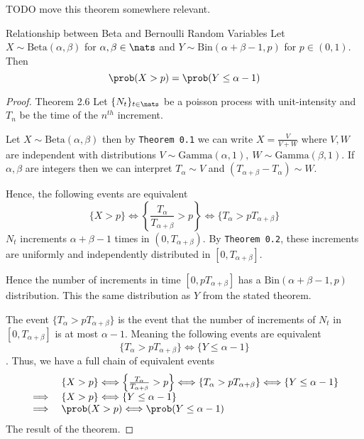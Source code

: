 \documentclass[11pt,a4paper]{article}
\begin{document}
  TODO move this theorem somewhere relevant.\\
  \begin{theorem}{Relationship between Beta and Bernoulli Random Variables}
    Let $X\sim\text{Beta}(\alpha,\beta)$ for $\alpha,\beta\in\nats$ and $Y\sim\text{Bin}(\alpha+\beta-1,p)$ for $p\in(0,1)$. Then
    \[ \prob(X>p)=\prob(Y\leq\alpha-1) \]
  \end{theorem}

  \begin{proof}{Theorem 2.6}
    Let $\{N_t\}_{t\in\nats}$ be a poisson process with unit-intensity and $T_n$ be the time of the $n^{th}$ increment.
    \par Let $X\sim\text{Beta}(\alpha,\beta)$ then by \texttt{Theorem 0.1} we can write $X=\frac{V}{V+W}$ where $V,W$ are independent with distributions $V\sim\text{Gamma}(\alpha,1),\ W\sim\text{Gamma}(\beta,1)$. If $\alpha,\beta$ are integers then we can interpret $T_\alpha\sim V$ and $(T_{\alpha+\beta}-T_\alpha)\sim W$.
    \par Hence, the following events are equivalent
    \[ \{X>p\}\Longleftrightarrow\left\{\frac{T_\alpha}{T_{\alpha+\beta}}>p\right\}\Longleftrightarrow\{T_\alpha>pT_{\alpha+\beta}\} \]
    $N_t$ increments $\alpha+\beta-1$ times in $(0,T_{\alpha+\beta})$. By \texttt{Theorem 0.2}, these increments are uniformly and independently distributed in $[0,T_{\alpha+\beta}]$.
    \par Hence the number of increments in time $[0,pT_{\alpha+\beta}]$ has a $\text{Bin}(\alpha+\beta-1,p)$ distribution. This the same distribution as $Y$ from the stated theorem.
    \par The event $\{T_\alpha>pT_{\alpha+\beta}\}$ is the event that the number of increments of $N_t$ in $[0,T_{\alpha+\beta}]$ is at most $\alpha-1$. Meaning the following events are equivalent
    \[ \{T_\alpha>pT_{\alpha+\beta}\}\Longleftrightarrow\{Y\leq \alpha-1\} \].
    Thus, we have a full chain of equivalent events
    \[\begin{array}{rl}
    &\{X>p\}\Longleftrightarrow\left\{\frac{T_\alpha}{T_{\alpha+\beta}}>p\right\}\Longleftrightarrow\{T_\alpha>pT_{\alpha+\beta}\}\Longleftrightarrow\{Y\leq \alpha-1\}\\
    \implies&\{X>p\}\Longleftrightarrow\{Y\leq \alpha-1\}\\
    \implies&\prob(X>p)\Longleftrightarrow\prob(Y\leq\alpha-1)
    \end{array}\]
    The result of the theorem.
    \proved
  \end{proof}
\end{document}
